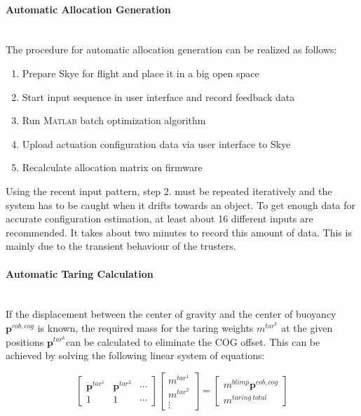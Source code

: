 \paragraph{Automatic Allocation Generation}~\\
The procedure for automatic allocation generation can be realized as follows:
\begin{enumerate}
\item Prepare Skye for flight and place it in a big open space
\item Start input sequence in user interface and record feedback data
\item Run \textsc{Matlab} batch optimization algorithm
\item Upload actuation configuration data via user interface to Skye
\item Recalculate allocation matrix on firmware
\end{enumerate}
Using the recent input pattern, step 2. must be repeated iteratively and the system has to be caught when it drifts towards an object.
To get enough data for accurate configuration estimation, at least about 16 different inputs are recommended.
It takes about two minutes to record this amount of data.
This is mainly due to the transient behaviour of the trusters.
 
\paragraph{Automatic Taring Calculation}~\\
If the displacement between the center of gravity and the center of buoyancy $\mathbf{p}^{cob,cog}$ is known, the required mass for the taring weights $m^{tar^k}$ at the given positions $\mathbf{p}^{tar^k}$can be calculated to eliminate the COG offset.
This can be achieved by solving the following linear system of equations:

\begin{equation}
\left[\begin{array}{ccc}
\mathbf{p}^{tar^1} & \mathbf{p}^{tar^2} & \cdots \\
1 & 1 & \cdots
\end{array} \right]
\left[\begin{array}{c}
m^{tar^1} \\
m^{tar^2} \\
\vdots
\end{array} \right]
=
\left[\begin{array}{c}
m^{blimp} \mathbf{p}^{cob,cog} \\
m^{taring~total}
\end{array} \right]
\end{equation}

